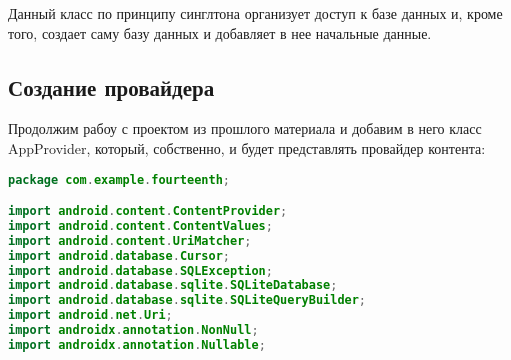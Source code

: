 Данный класс по принципу синглтона организует доступ к базе данных и,
кроме того, создает саму базу данных и добавляет в нее начальные данные.

\subsection{Создание провайдера}
Продолжим рабоу с проектом из прошлого материала и добавим в него класс
AppProvider, который, собственно, и будет представлять провайдер
контента:

\begin{lstlisting}[language=Java
	, label=lst:
	]
package com.example.fourteenth;

import android.content.ContentProvider;
import android.content.ContentValues;
import android.content.UriMatcher;
import android.database.Cursor;
import android.database.SQLException;
import android.database.sqlite.SQLiteDatabase;
import android.database.sqlite.SQLiteQueryBuilder;
import android.net.Uri;
import androidx.annotation.NonNull;
import androidx.annotation.Nullable;


\end{lstlisting}
